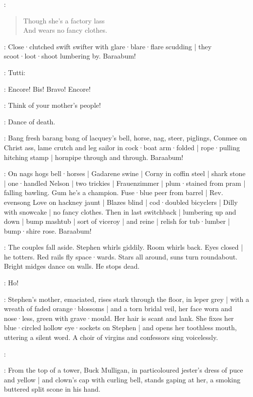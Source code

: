 \Pianola:
\begin{verse}
%
    Though she's a factory lass\\
    And wears no fancy clothes.
\end{verse}

:
Close·clutched swift swifter with glare·blare·flare scudding |
they scoot·loot·shoot lumbering by.
Baraabum!

:
Tutti:

\All:
Encore!
Bis!
Bravo!
Encore!

\Simon[2]:
Think of your mother's people!

\Stephen:
Dance of death.

:
Bang fresh barang bang of lacquey's bell,
%
horse,
nag,
steer,
piglings,
Conmee on Christ ass,
lame crutch and leg sailor in cock·boat arm·folded |
rope·pulling hitching stamp |
hornpipe through and through.
Baraabum!

:
On nags hogs bell·horses |
Gadarene swine |
Corny in coffin steel |
shark stone |
one·handled Nelson |
two trickies |
Frauenzimmer |
plum·stained from pram |
falling bawling.
Gum he's a champion.
Fuse·blue peer from barrel |
Rev. evensong Love on hackney jaunt |
Blazes blind |
cod·doubled bicyclers |
Dilly with snowcake |
no fancy clothes.
Then in last switchback |
lumbering up and down |
bump mashtub |
sort of viceroy |
and reine |
relish for tub·lumber |
bump·shire rose.
%
Baraabum!

:
The couples fall aside.
Stephen whirls giddily.
Room whirls back.
Eyes closed |
he totters.
Red rails fly space·wards.
Stars all around,
suns turn roundabout.
Bright midges dance on walls.
He stops dead.

\Stephen:
Ho!

:
Stephen's mother,
emaciated,
rises stark through the floor,
in leper grey |
with a wreath of faded orange·blossoms |
and a torn bridal veil,
her face worn and nose·less,
green with grave·mould.
Her hair is scant and lank.
%
She fixes her blue·circled hollow eye·sockets on Stephen |
and opens her toothless mouth,
uttering a silent word.
A choir of virgins and confessors sing voicelessly.

\Choir:
\begin{verse}
\end{verse}

:
From the top of a tower,
Buck Mulligan,
in particoloured jester's dress of puce and yellow |
and clown's cap with curling bell,
stands gaping at her,
a smoking buttered split scone in his hand.

